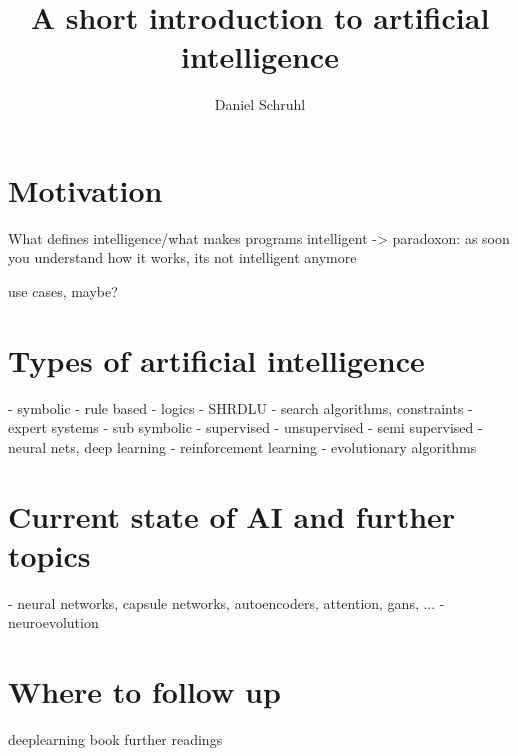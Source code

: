 \documentclass[jou,apacite]{apa6}
\title{A short introduction to artificial intelligence}
\author{Daniel Schruhl}
\affiliation{ThoughtWorks}
\begin{document}
\maketitle    
                        
\section{Motivation}
What defines intelligence/what makes programs intelligent -> paradoxon: as soon you understand how it works, its not intelligent anymore \cite{Sample}

use cases, maybe?

\section{Types of artificial intelligence}
 - symbolic
  - rule based
  - logics
  - SHRDLU
  - search algorithms, constraints
  - expert systems
 - sub symbolic
  - supervised
  - unsupervised
  - semi supervised
   - neural nets, deep learning
  - reinforcement learning
  - evolutionary algorithms

\section{Current state of AI and further topics}
 - neural networks, capsule networks, autoencoders, attention, gans, ...
 - neuroevolution

\section{Where to follow up}
deeplearning book
further readings


\end{document}
